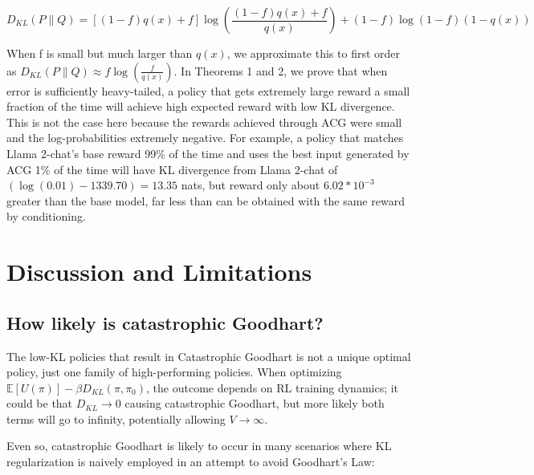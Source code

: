 \documentclass{article}
\begin{document}
\[ D_{KL}(P \| Q) = \left[(1-f)q(x) + f\right] \log \left(\frac{(1-f)q(x) + f}{q(x)}\right) + (1-f) \log (1-f) (1 - q(x)) \]

When f is small but much larger than $q(x)$, we approximate this to first order as $D_{KL}(P \| Q) \approx f \log \left(\frac{f}{q(x)}\right)$. In Theorems 1 and 2, we prove that when error is sufficiently heavy-tailed, a policy that gets extremely large reward a small fraction of the time will achieve high expected reward with low KL divergence. This is not the case here because the rewards achieved through ACG were small and the log-probabilities extremely negative. For example, a policy that matches Llama 2-chat's base reward 99\% of the time and uses the best input generated by ACG 1\% of the time will have KL divergence from Llama 2-chat of $(\log(0.01) - 1339.70) = 13.35$ nats, but reward only about $6.02 * 10^{-3}$ greater than the base model, far less than can be obtained with the same reward by conditioning.

\section{Discussion and Limitations\label{sec:discussion}}

\subsection{How likely is catastrophic Goodhart?}

The low-KL policies that result in Catastrophic Goodhart is not a unique optimal policy, just one family of high-performing policies. When optimizing $\mathbb{E} [U(\pi)]-\beta D_{K L}\left(\pi, \pi_0 \right)$, the outcome depends on RL training dynamics; it could be that $D_{KL} \to 0$ causing catastrophic Goodhart, but more likely both terms will go to infinity, potentially allowing $V \to \infty$.

Even so, catastrophic Goodhart is likely to occur in many scenarios where KL regularization is naively employed in an attempt to avoid Goodhart’s Law:
\end{document}
